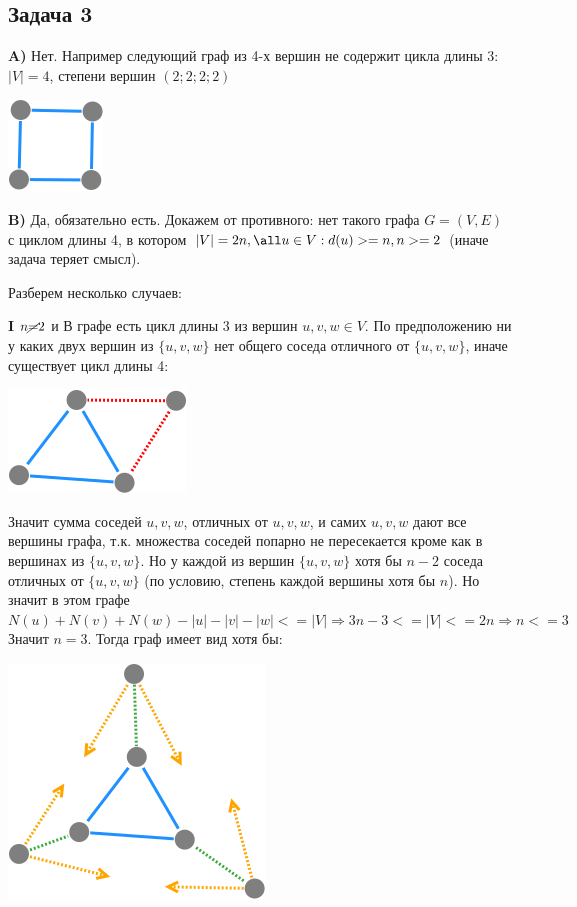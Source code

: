 \documentclass{article}
\begin{document}
\begin{center}
	\subsection*{Задача 3}
\end{center}

\textbf{A)} Нет. Например следующий граф из 4-х вершин не содержит цикла длины 3:
$|V| = 4$, степени вершин $(2;2;2;2)$

\includegraphics[scale=0.5]{3_1.png}

\textbf{B)} Да, обязательно есть. Докажем от противного: нет такого графа $ G = (V, E) $ с циклом длины 4, в котором $ |V| = 2n, \space \all u \in V: d(u) >= n,\space n >= 2 $ (иначе задача теряет смысл).

Разберем несколько случаев:

\textbf{I} 
$n \cancel{=} 2$ и В графе есть цикл длины 3 из вершин $ u, v, w \in V$. По предположению ни у каких двух вершин из $\{u, v, w\}$ нет общего соседа отличного от $\{u, v, w\}$, иначе существует цикл длины 4:

\includegraphics[scale=0.5]{3_2.png}

Значит сумма соседей $u,v,w$, отличных от $u,v,w$, и самих $u,v,w$ дают все вершины графа, т.к. множества соседей попарно не пересекается кроме как в вершинах из $\{u, v, w\}$. Но у каждой из вершин $\{u, v, w\}$ хотя бы $n - 2$ соседа отличных от $\{u, v, w\}$ (по условию, степень каждой вершины хотя бы $n$). Но значит в этом графе $N(u) + N(v) + N(w) - |{u}| - |{v}| - |{w}| <= |V| \Rightarrow 3n - 3 <= |V| <= 2n \Rightarrow n <= 3$
Значит $n = 3$. Тогда граф имеет вид хотя бы:

\includegraphics[scale=0.5]{3_3.png}
 
\end{document}
